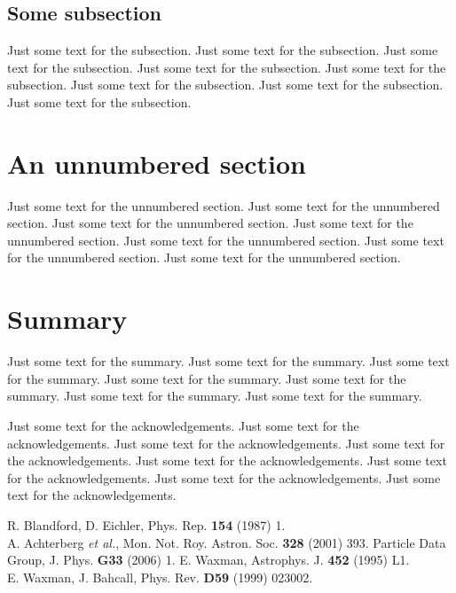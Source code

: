 \documentclass[a4paper,11pt,twocolumn,pdftex]{nveart}
\begin{document}
\subsection{Some subsection}
Just some text for the subsection. Just some text for the subsection.
Just some text for the subsection. Just some text for the subsection.
Just some text for the subsection. Just some text for the subsection.
Just some text for the subsection. Just some text for the subsection.

\section*{An unnumbered section}
Just some text for the unnumbered section. Just some text for the unnumbered section. 
Just some text for the unnumbered section. Just some text for the unnumbered section. 
Just some text for the unnumbered section. Just some text for the unnumbered section. 
Just some text for the unnumbered section. 

\section{Summary}
Just some text for the summary. Just some text for the summary.
Just some text for the summary. Just some text for the summary.
Just some text for the summary. Just some text for the summary.
Just some text for the summary.

\begin{ack}
Just some text for the acknowledgements. Just some text for the acknowledgements.
Just some text for the acknowledgements. Just some text for the acknowledgements.
Just some text for the acknowledgements. Just some text for the acknowledgements.
Just some text for the acknowledgements. Just some text for the acknowledgements.
\end{ack}

\begin{thebibliography}{99}
 R. Blandford, D. Eichler, Phys. Rep. {\bf 154} (1987) 1.\\
 A. Achterberg {\em et al.}, Mon. Not. Roy. Astron. Soc. {\bf 328} (2001) 393.
 Particle Data Group, J. Phys. {\bf G33} (2006) 1. 
 E. Waxman, Astrophys. J. {\bf 452} (1995) L1.\\
 E. Waxman, J. Bahcall, Phys. Rev. {\bf D59} (1999) 023002.
\end{thebibliography}
\end{document}
